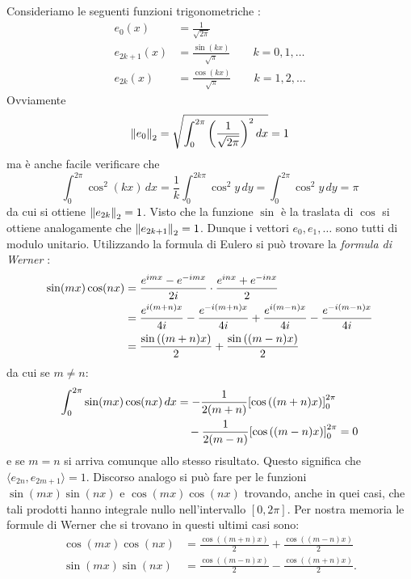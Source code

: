 Consideriamo le seguenti funzioni trigonometriche%
%
:
\begin{equation}\label{eq:54741346}
\begin{aligned}
  e_0 (x) &= \frac{1}{\sqrt{2\pi}} \\
  e_{2k+1}(x) &= \frac{\sin(kx)}{\sqrt{\pi}} \qquad k=0,1,\dots\\
  e_{2k}(x) &= \frac{\cos(kx)}{\sqrt{\pi}} \qquad k=1,2,\dots
\end{aligned}
\end{equation}
Ovviamente
\[
  {\left\Vert e_0\right\Vert}_2=\sqrt{\int_{0}^{2\pi} {\left( \frac{1}{\sqrt{2\pi}} \right)}^2\, dx} = 1
\]
ma è anche facile verificare che
\[
  \int_{0}^{2\pi} \cos^2 (kx)\, dx
  = \frac{1}{k}\int_{0}^{2k\pi} \cos^2 y\, dy
  = \int_{0}^{2\pi} \cos^2 y\, dy = \pi
\]
da cui si ottiene ${\left\Vert e_{2k}\right\Vert}_2 = 1$.
Visto che la funzione $\sin$ è la traslata di $\cos$ si
ottiene analogamente che ${\left\Vert e_{2k+1}\right\Vert}_2=1$.
Dunque i vettori $e_0,e_1,\dots$ sono tutti di modulo unitario.
Utilizzando la formula di Eulero
si può trovare la \emph{formula di Werner}%
:
%
%
\begin{align*}
 \sin(mx)\cos(nx)
 &= \frac{e^{imx}-e^{-imx}}{2i}\cdot \frac{e^{inx}+e^{-inx}}{2}\\
 &= \frac{e^{i(m+n)x}}{4i} - \frac{e^{-i(m+n)x}}{4i} 
  + \frac{e^{i(m-n)x}}{4i} - \frac{e^{-i(m-n)x}}{4i}\\
 &= \frac{\sin{\left( (m+n)x \right)}}{2} + \frac{\sin{\left( (m-n)x \right)}}{2}
\end{align*}
da cui se $m\neq n$:
\begin{align*}
 \int_{0}^{2\pi} \sin(mx)\cos(nx)\, dx &=
 -\frac 1 {2(m+n)} {\left[ \cos{\left( (m+n)x \right)} \right]}_{0}^{2\pi} \\
  &\quad - \frac{1}{2(m-n)}{\left[ \cos{\left( (m-n)x \right)} \right]}_{0}^{2\pi} = 0
\end{align*}
e se $m=n$ si arriva comunque allo stesso risultato.
Questo significa che $\langle e_{2n},e_{2m+1}\rangle = 1$.
Discorso analogo si può fare per le funzioni $\sin(mx)\sin(nx)$ e $\cos(mx)\cos(nx)$
trovando, anche in quei casi, che tali prodotti hanno integrale nullo
nell'intervallo $[0,2\pi]$.
Per nostra memoria le formule di Werner che si trovano
in questi ultimi casi sono:
%
%
%
%
\begin{align*}
  \cos(mx) \cos(nx) &=  \frac{\cos((m+n)x)}{2} + \frac{\cos((m-n)x)}{2}\\
  \sin(mx) \sin(nx) &=  \frac{\cos((m-n)x)}{2} - \frac{\cos((m+n)x)}{2}.
\end{align*}

